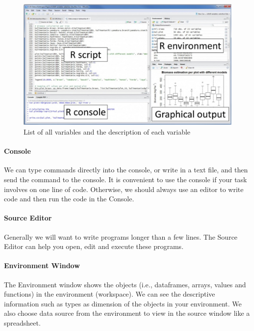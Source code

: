 \documentclass[
]{article}
\begin{document}
\begin{figure}

{\centering \includegraphics[width=15.1in]{img/RStudioGUI01} 

}

\caption{List of all variables and the description of each variable}\label{fig:unnamed-chunk-1}
\end{figure}

\hypertarget{console}{%
\paragraph{Console}\label{console}}

We can type commands directly into the console, or write in a text file,
and then send the command to the console. It is convenient to use the
console if your task involves on one line of code. Otherwise, we should
always use an editor to write code and then run the code in the Console.

\hypertarget{source-editor}{%
\paragraph{Source Editor}\label{source-editor}}

Generally we will want to write programs longer than a few lines. The
Source Editor can help you open, edit and execute these programs.

\hypertarget{environment-window}{%
\paragraph{Environment Window}\label{environment-window}}

The Environment window shows the objects (i.e., dataframes, arrays,
values and functions) in the environment (workspace). We can see the
descriptive information such as types as dimension of the objects in
your environment. We also choose data source from the environment to
view in the source window like a spreadsheet.
\end{document}
